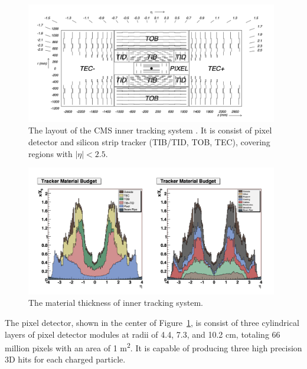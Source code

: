 \begin{figure}[ht]
    \centering
    \includegraphics[width=0.98\textwidth]{chapters/CMSExperiment/sectionDetector/figures/tracker.png}
    \caption{The layout of the CMS inner tracking system \cite{exhep:cms:Chatrchyan:2008aa}. It is consist of pixel detector and silicon strip tracker (TIB/TID, TOB, TEC), covering regions with $|\eta|<2.5$. }
    \label{fig:cmsexperiment:detector:tracker}
\end{figure}


\begin{figure}[ht]
    \centering
    \includegraphics[width=0.98\textwidth]{chapters/CMSExperiment/sectionDetector/figures/trackerMaterial.png}
    \caption{The material thickness of inner tracking system.}
    \label{fig:cmsexperiment:detector:trackerMaterial}
\end{figure}




The pixel detector, shown in the center of Figure~\ref{fig:cmsexperiment:detector:tracker}, is consist of three cylindrical layers of pixel detector modules at radii of 4.4, 7.3, and 10.2 cm, totaling 66 million pixels with an area of 1 \si{\m \squared}. It is capable of producing three high precision 3D hits for each charged particle. 


